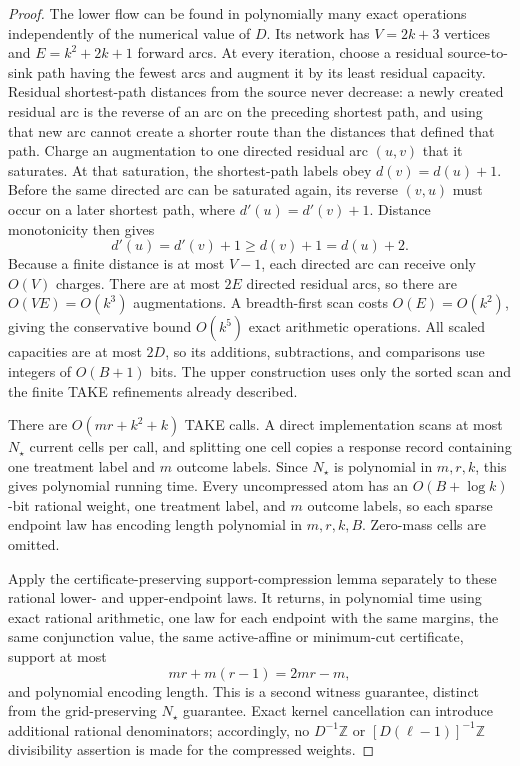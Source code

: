 \documentclass{article}
\begin{document}
\begin{proof}
The lower flow can be found in polynomially many exact operations independently of the numerical value of \(D\).  Its network has \(V=2k+3\) vertices and \(E=k^2+2k+1\) forward arcs.  At every iteration, choose a residual source-to-sink path having the fewest arcs and augment it by its least residual capacity.  Residual shortest-path distances from the source never decrease: a newly created residual arc is the reverse of an arc on the preceding shortest path, and using that new arc cannot create a shorter route than the distances that defined that path.  Charge an augmentation to one directed residual arc \((u,v)\) that it saturates.  At that saturation, the shortest-path labels obey \(d(v)=d(u)+1\).  Before the same directed arc can be saturated again, its reverse \((v,u)\) must occur on a later shortest path, where \(d'(u)=d'(v)+1\).  Distance monotonicity then gives
\[
d'(u)=d'(v)+1\geq d(v)+1=d(u)+2.
\]
Because a finite distance is at most \(V-1\), each directed arc can receive only \(O(V)\) charges.  There are at most \(2E\) directed residual arcs, so there are \(O(VE)=O(k^3)\) augmentations.  A breadth-first scan costs \(O(E)=O(k^2)\), giving the conservative bound \(O(k^5)\) exact arithmetic operations.  All scaled capacities are at most \(2D\), so its additions, subtractions, and comparisons use integers of \(O(B+1)\) bits.  The upper construction uses only the sorted scan and the finite TAKE refinements already described.

There are \(O(mr+k^2+k)\) TAKE calls.  A direct implementation scans at most \(N_\star\) current cells per call, and splitting one cell copies a response record containing one treatment label and \(m\) outcome labels.  Since \(N_\star\) is polynomial in \(m,r,k\), this gives polynomial running time.  Every uncompressed atom has an \(O(B+\log k)\)-bit rational weight, one treatment label, and \(m\) outcome labels, so each sparse endpoint law has encoding length polynomial in \(m,r,k,B\).  Zero-mass cells are omitted.

Apply the certificate-preserving support-compression lemma separately to these rational lower- and upper-endpoint laws.  It returns, in polynomial time using exact rational arithmetic, one law for each endpoint with the same margins, the same conjunction value, the same active-affine or minimum-cut certificate, support at most
\[
mr+m(r-1)=2mr-m,
\]
and polynomial encoding length.  This is a second witness guarantee, distinct from the grid-preserving \(N_\star\) guarantee.  Exact kernel cancellation can introduce additional rational denominators; accordingly, no \(D^{-1}\mathbb Z\) or \([D(\ell-1)]^{-1}\mathbb Z\) divisibility assertion is made for the compressed weights.


\end{proof}
\end{document}

